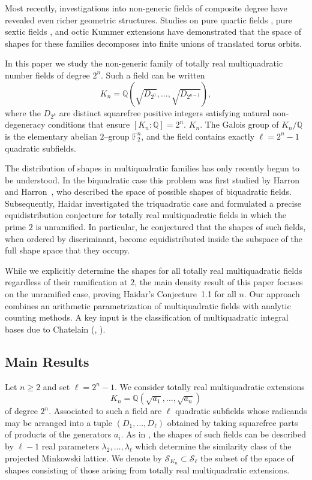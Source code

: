 \documentclass{amsart}
\newcommand{\Q}{\mathbb{Q}}
\newcommand{\F}{\mathbb{F}}
\theoremstyle{plain}
\theoremstyle{definition}
\theoremstyle{remark}
\numberwithin{equation}{section}
\begin{document}
Most recently, investigations into non-generic fields of composite degree have revealed even richer geometric structures. Studies on pure quartic fields \cite{purequartic}, pure sextic fields \cite{JKRR26}, and octic Kummer extensions \cite{Octic} have demonstrated that the space of shapes for these families decomposes into finite unions of translated torus orbits.
\par In this paper we study the non-generic family of totally real
multiquadratic number fields of degree $2^n$.  Such a field can be
written
\[
K_n=\Q(\sqrt{D_{2^0}},\dots,\sqrt{D_{2^{n-1}}}),
\]
where the $D_{2^k}$ are distinct squarefree positive integers satisfying
natural non-degeneracy conditions that ensure $[K_n:\Q]=2^n$.
$K_n$.  
The Galois group of $K_n/\Q$ is the elementary abelian
$2$–group $\F_2^n$, and the field contains exactly
$\ell=2^n-1$ quadratic subfields.

The distribution of shapes in multiquadratic families has only recently
begun to be understood.  In the biquadratic case this problem was first
studied by Harron and Harron~\cite{PR20}, who described the space of possible shapes of biquadratic fields.  Subsequently, Haidar
\cite{Hassan} investigated the triquadratic case and formulated a
precise equidistribution conjecture for totally real multiquadratic
fields in which the prime $2$ is unramified. In particular, he conjectured that the shapes of such fields,
when ordered by discriminant, become equidistributed inside the
subspace of the full shape space that they occupy.
\par While we explicitly determine the shapes for all totally real multiquadratic fields regardless of their ramification at $2$, the main density result of this paper focuses on the unramified case, proving Haidar's Conjecture~1.1 for all $n$. Our approach combines an arithmetic parametrization
of multiquadratic fields with analytic counting methods. A key input is
the classification of multiquadratic integral bases due to Chatelain
(\cite{Chatelain}, \cite[Theorem~2.1]{Man}).  
\subsection{Main Results}

Let $n\ge 2$ and set $\ell=2^{n}-1$.  We consider totally real
multiquadratic extensions
\[
K_n=\Q(\sqrt{a_1},\dots,\sqrt{a_n})
\]
of degree $2^n$.  Associated to such a field are $\ell$ quadratic
subfields whose radicands may be arranged into a tuple
$(D_1,\dots,D_\ell)$ obtained by taking squarefree parts of products of
the generators $a_i$.  As in \cite{Hassan}, the shapes of such fields
can be described by $\ell-1$ real parameters $\lambda_2,\dots,\lambda_\ell$ which determine the similarity class of the projected Minkowski
lattice.  We denote by $\mathcal{S}_{K_n}\subset\mathcal{S}_\ell$ the
subset of the space of shapes consisting of those arising from totally
real multiquadratic extensions.
\end{document}
